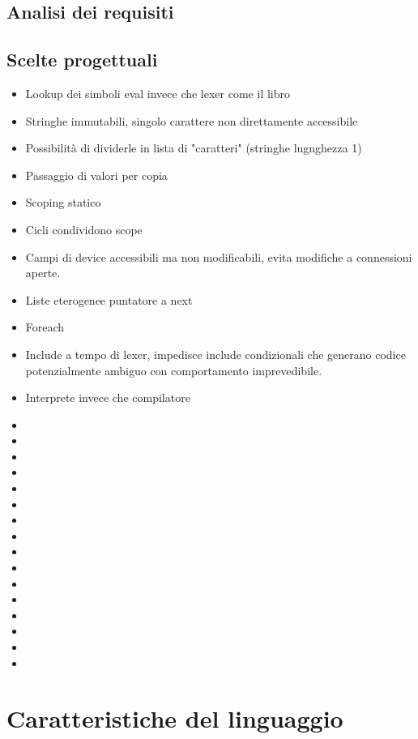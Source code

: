 \documentclass[10pt]{article}
\begin{document}
\subsection{Analisi dei requisiti}

\subsection{Scelte progettuali}

\begin{itemize}
	\item Lookup dei simboli eval invece che lexer come il libro~\cite{levine2009flex}
	\item Stringhe immutabili, singolo carattere non direttamente accessibile
	\item Possibilità di dividerle in lista di "caratteri" (stringhe lugnghezza 1)
	\item Passaggio di valori per copia
	\item Scoping statico
	\item Cicli condividono scope
	\item Campi di device accessibili ma non modificabili, evita modifiche a connessioni aperte.
	\item Liste eterogenee puntatore a next
	\item Foreach
	\item Include a tempo di lexer, impedisce include condizionali che generano codice potenzialmente ambiguo con comportamento imprevedibile.
	\item Interprete invece che compilatore
	\item 
	\item 
	\item 
	\item 
	\item 
	\item 
	\item 
	\item 
	\item 
	\item 
	\item 
	\item 
	\item 
	\item 
	\item 
	\item 
\end{itemize}

\section{Caratteristiche del linguaggio}\label{section:caratteristiche-linguaggio}
\end{document}
